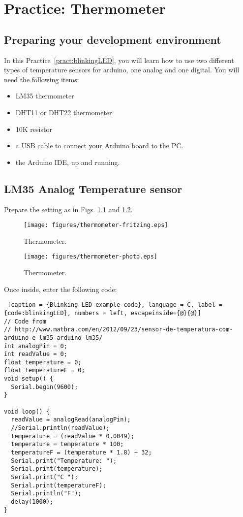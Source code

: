 \chapter{Practice: Thermometer}\label{pract:thermometer}


\section{Preparing your development environment}
In this Practice~\ref{pract:blinkingLED},  you will learn how to use two different types of temperature sensors for arduino, one analog and one digital.
You will need the following items:
\begin{itemize}
 \item LM35 thermometer
 \item DHT11 or DHT22 thermometer
 \item 10K resistor
 \item a USB cable to connect your Arduino board to the PC.
 \item the Arduino IDE, up and running.
\end{itemize}

\section{LM35 Analog Temperature sensor} 

Prepare the setting as in Figs. \ref{fig:thermometer-fritzing} and \ref{fig:thermometer-photo}.

\begin{figure}[htbp]
  \centering
  \texttt{[image: figures/thermometer-fritzing.eps]}
  \caption{Thermometer.}
  \label{fig:thermometer-fritzing}
\end{figure}

\begin{figure}[htbp]
  \centering
  \texttt{[image: figures/thermometer-photo.eps]}
  \caption{Thermometer.}
  \label{fig:thermometer-photo}
\end{figure}

Once inside, enter the following code:

\begin{lstlisting} [caption = {Blinking LED example code}, language = C, label = {code:blinkingLED}, numbers = left, escapeinside={@}{@}]
// Code from
// http://www.matbra.com/en/2012/09/23/sensor-de-temperatura-com-arduino-e-lm35-arduino-lm35/ 
int analogPin = 0; 
int readValue = 0; 
float temperature = 0; 
float temperatureF = 0;
void setup() { 
  Serial.begin(9600); 
}

void loop() { 
  readValue = analogRead(analogPin);
  //Serial.println(readValue);
  temperature = (readValue * 0.0049); 
  temperature = temperature * 100; 
  temperatureF = (temperature * 1.8) + 32;
  Serial.print("Temperature: "); 
  Serial.print(temperature); 
  Serial.print("C ");
  Serial.print(temperatureF);
  Serial.println("F");
  delay(1000); 
}
\end{lstlisting}

